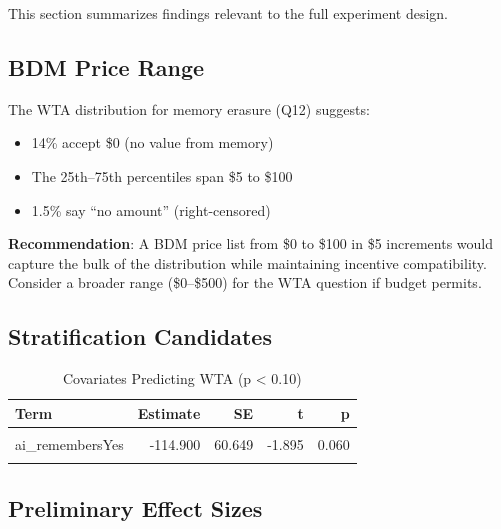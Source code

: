 \documentclass[
]{article}
\providecommand{\tightlist}{%
  \setlength{\itemsep}{0pt}\setlength{\parskip}{0pt}}
\begin{document}
This section summarizes findings relevant to the full experiment design.

\subsection{BDM Price Range}\label{bdm-price-range}

The WTA distribution for memory erasure (Q12) suggests:

\begin{itemize}
\tightlist
\item
  14\% accept \$0 (no value from memory)
\item
  The 25th--75th percentiles span \$5 to \$100
\item
  1.5\% say ``no amount'' (right-censored)
\end{itemize}

\textbf{Recommendation}: A BDM price list from \$0 to \$100 in \$5
increments would capture the bulk of the distribution while maintaining
incentive compatibility. Consider a broader range (\$0--\$500) for the
WTA question if budget permits.

\subsection{Stratification Candidates}\label{stratification-candidates}

\begin{longtable}[t]{lrrrr}
\caption{\label{tab:stratification}Covariates Predicting WTA (p < 0.10)}\\
\toprule
Term & Estimate & SE & t & p\\
\midrule
\cellcolor{gray!10}{frequency\_ordered.L} & \cellcolor{gray!10}{120.572} & \cellcolor{gray!10}{48.011} & \cellcolor{gray!10}{2.511} & \cellcolor{gray!10}{0.013}\\
ai\_remembersYes & -114.900 & 60.649 & -1.895 & 0.060\\
\cellcolor{gray!10}{perceived\_improvement\_num} & \cellcolor{gray!10}{34.197} & \cellcolor{gray!10}{15.892} & \cellcolor{gray!10}{2.152} & \cellcolor{gray!10}{0.033}\\
\bottomrule
\end{longtable}

\subsection{Preliminary Effect Sizes}\label{preliminary-effect-sizes}
\end{document}
